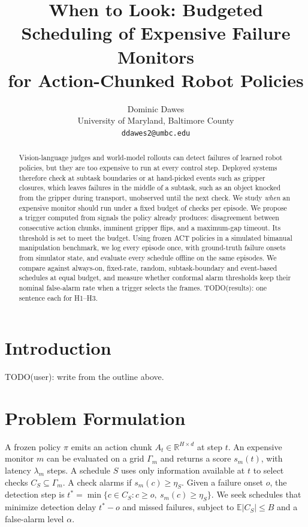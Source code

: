\documentclass[11pt]{article}
\title{When to Look: Budgeted Scheduling of Expensive Failure Monitors\\for Action-Chunked Robot Policies}
\author{Dominic Dawes\\University of Maryland, Baltimore County\\\texttt{ddawes2@umbc.edu}}
\date{}
\begin{document}
\maketitle

\begin{abstract}
Vision-language judges and world-model rollouts can detect failures of learned robot policies, but they are too expensive to run at every control step. Deployed systems therefore check at subtask boundaries or at hand-picked events such as gripper closures, which leaves failures in the middle of a subtask, such as an object knocked from the gripper during transport, unobserved until the next check.
We study \emph{when} an expensive monitor should run under a fixed budget of checks per episode. We propose a trigger computed from signals the policy already produces: disagreement between consecutive action chunks, imminent gripper flips, and a maximum-gap timeout. Its threshold is set to meet the budget.
Using frozen ACT policies in a simulated bimanual manipulation benchmark, we log every episode once, with ground-truth failure onsets from simulator state, and evaluate every schedule offline on the same episodes. We compare against always-on, fixed-rate, random, subtask-boundary and event-based schedules at equal budget, and measure whether conformal alarm thresholds keep their nominal false-alarm rate when a trigger selects the frames.
TODO(results): one sentence each for H1--H3.
\end{abstract}

\section{Introduction}
TODO(user): write from the outline above.

\section{Problem Formulation}
A frozen policy $\pi$ emits an action chunk $A_t \in \mathbb{R}^{H \times d}$ at step $t$. An expensive monitor $m$ can be evaluated on a grid $\Gamma_m$ and returns a score $s_m(t)$, with latency $\lambda_m$ steps. A schedule $S$ uses only information available at $t$ to select checks $C_S \subseteq \Gamma_m$. A check alarms if $s_m(c) \ge \eta_S$. Given a failure onset $o$, the detection step is $t^\ast = \min\{c \in C_S : c \ge o,\ s_m(c) \ge \eta_S\}$. We seek schedules that minimize detection delay $t^\ast - o$ and missed failures, subject to $\mathbb{E}|C_S| \le B$ and a false-alarm level $\alpha$.
\end{document}
